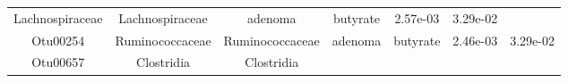 \documentclass[11pt,]{article}
\begin{document}
\begin{longtable}[]{@{}ccccccc@{}}
\begin{minipage}[t]{0.17\columnwidth}
Lachnospiraceae\strut
\end{minipage} & \begin{minipage}[t]{0.17\columnwidth}\centering\strut
Lachnospiraceae\strut
\end{minipage} & \begin{minipage}[t]{0.09\columnwidth}\centering\strut
adenoma\strut
\end{minipage} & \begin{minipage}[t]{0.11\columnwidth}\centering\strut
butyrate\strut
\end{minipage} & \begin{minipage}[t]{0.09\columnwidth}\centering\strut
2.57e-03\strut
\end{minipage} & \begin{minipage}[t]{0.09\columnwidth}\centering\strut
3.29e-02\strut
\end{minipage}\tabularnewline
\begin{minipage}[t]{0.09\columnwidth}\centering\strut
Otu00254\strut
\end{minipage} & \begin{minipage}[t]{0.17\columnwidth}\centering\strut
Ruminococcaceae\strut
\end{minipage} & \begin{minipage}[t]{0.17\columnwidth}\centering\strut
Ruminococcaceae\strut
\end{minipage} & \begin{minipage}[t]{0.09\columnwidth}\centering\strut
adenoma\strut
\end{minipage} & \begin{minipage}[t]{0.11\columnwidth}\centering\strut
butyrate\strut
\end{minipage} & \begin{minipage}[t]{0.09\columnwidth}\centering\strut
2.46e-03\strut
\end{minipage} & \begin{minipage}[t]{0.09\columnwidth}\centering\strut
3.29e-02\strut
\end{minipage}\tabularnewline
\begin{minipage}[t]{0.09\columnwidth}\centering\strut
Otu00657\strut
\end{minipage} & \begin{minipage}[t]{0.17\columnwidth}\centering\strut
Clostridia\strut
\end{minipage} & \begin{minipage}[t]{0.17\columnwidth}\centering\strut
Clostridia\strut
\end{minipage} & \begin{minipage}[t]{0.09\columnwidth}\centering\strut

\end{minipage}
\end{longtable}
\end{document}
